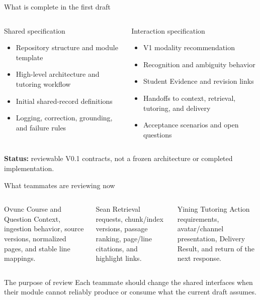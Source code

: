 \documentclass[aspectratio=169,10pt]{beamer}
\begin{document}
\begin{frame}{What is complete in the first draft}
\begin{columns}[T,onlytextwidth]
\begin{block}{Shared specification}
\begin{itemize}
\item Repository structure and module template
\item High-level architecture and tutoring workflow
\item Initial shared-record definitions
\item Logging, correction, grounding, and failure rules
\end{itemize}
\end{block}
\begin{block}{Interaction specification}
\begin{itemize}
\item V1 modality recommendation
\item Recognition and ambiguity behavior
\item Student Evidence and revision links
\item Handoffs to context, retrieval, tutoring, and delivery
\item Acceptance scenarios and open questions
\end{itemize}
\end{block}
\end{columns}
\vspace{.55em}
\centering
\textbf{Status:} reviewable V0.1 contracts, not a frozen architecture or completed implementation.
\end{frame}

\begin{frame}{What teammates are reviewing now}
\begin{columns}[T,onlytextwidth]
\begin{block}{Ovunc}
Course and Question Context, ingestion behavior, source versions, normalized pages, and stable line mappings.
\end{block}
\begin{block}{Sean}
Retrieval requests, chunk/index versions, passage ranking, page/line citations, and highlight links.
\end{block}
\begin{block}{Yining}
Tutoring Action requirements, avatar/channel presentation, Delivery Result, and return of the next response.
\end{block}
\end{columns}
\vspace{.65em}
\begin{block}{The purpose of review}
Each teammate should change the shared interfaces when their module cannot reliably produce or consume what the current draft assumes.
\end{block}
\end{frame}
\end{document}
